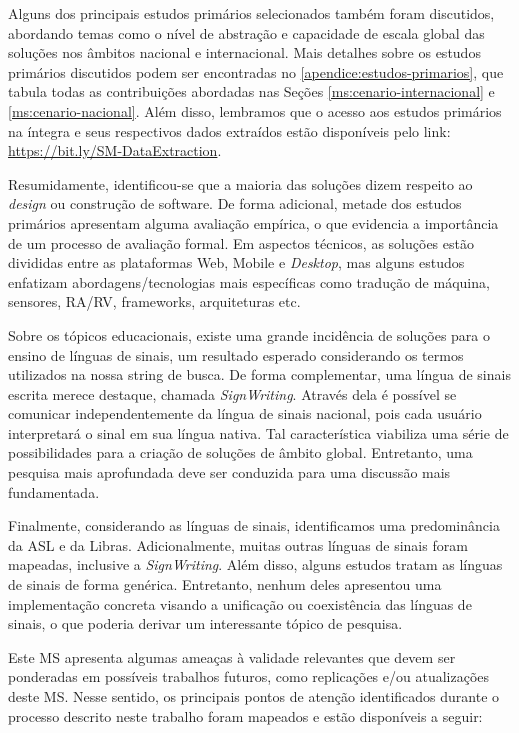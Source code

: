 Alguns dos principais estudos primários selecionados também foram discutidos, abordando temas como o nível de abstração e capacidade de escala global das soluções nos âmbitos nacional e internacional. Mais detalhes sobre os estudos primários discutidos podem ser encontradas no \autoref{apendice:estudos-primarios}, que tabula todas as contribuições abordadas nas Seções \ref{ms:cenario-internacional} e \ref{ms:cenario-nacional}. Além disso, lembramos que o acesso aos estudos primários na íntegra e seus respectivos dados extraídos estão disponíveis pelo link: \url{https://bit.ly/SM-DataExtraction}.

Resumidamente, identificou-se que a maioria das soluções dizem respeito ao \textit{design} ou construção de software. De forma adicional, metade dos estudos primários apresentam alguma avaliação empírica, o que evidencia a importância de um processo de avaliação formal. Em aspectos técnicos, as soluções estão divididas entre as plataformas Web, Mobile e \textit{Desktop}, mas alguns estudos enfatizam abordagens/tecnologias mais específicas como tradução de máquina, sensores, RA/RV, frameworks, arquiteturas etc.

Sobre os tópicos educacionais, existe uma grande incidência de soluções para o ensino de línguas de sinais, um resultado esperado considerando os termos utilizados na nossa string de busca. De forma complementar, uma língua de sinais escrita merece destaque, chamada \textit{SignWriting}. Através dela é possível se comunicar  independentemente da língua de sinais nacional, pois cada usuário interpretará o sinal em sua língua nativa. Tal característica viabiliza uma série de possibilidades para a criação de soluções de âmbito global. Entretanto, uma pesquisa mais aprofundada deve ser conduzida para uma discussão mais fundamentada.

Finalmente, considerando as línguas de sinais, identificamos uma predominância da ASL e da Libras. Adicionalmente, muitas outras línguas de sinais foram mapeadas, inclusive a \textit{SignWriting}. Além disso, alguns estudos tratam as línguas de sinais de forma genérica. Entretanto, nenhum deles apresentou uma implementação concreta visando a unificação ou coexistência das línguas de sinais, o que poderia derivar um interessante tópico de pesquisa.

Este MS apresenta algumas ameaças à validade relevantes que devem ser ponderadas em possíveis trabalhos futuros, como replicações e/ou atualizações deste MS. Nesse sentido, os principais pontos de atenção identificados durante o processo descrito neste trabalho foram mapeados e estão disponíveis a seguir:

